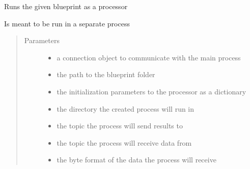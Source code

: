 \documentclass[letterpaper,10pt,english]{sphinxmanual}
\begin{document}

\begin{fulllineitems}
\label{\detokenize{src.processors:src.processors.models.processor_process}}
Runs the given blueprint as a processor

Is meant to be run in a separate process
\begin{quote}\begin{description}
\item[{Parameters}] \leavevmode\begin{itemize}
\item {} 
 \textendash{} a connection object to communicate with the main process

\item {} 
 \textendash{} the path to the blueprint folder

\item {} 
 \textendash{} the initialization parameters to the processor as a dictionary

\item {} 
 \textendash{} the directory the created process will run in

\item {} 
 \textendash{} the topic the process will send results to

\item {} 
 \textendash{} the topic the process will receive data from

\item {} 
 \textendash{} the byte format of the data the process will receive


\end{itemize}
\end{description}
\end{quote}
\end{fulllineitems}
\end{document}
